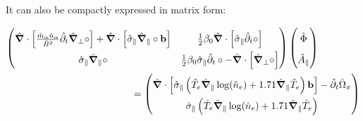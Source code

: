 It can also be compactly expressed in matrix form: 

\begin{align}
\renewcommand\arraystretch{1.8}
\begin{pmatrix}
\hat{\grad}\cdot\left[\frac{\hat{m}_\alpha \hat{n}_\alpha}{ \hat{B}^2}\hat{\partial}_t\hat{\grad}_\perp\circ\right] +  \hat{\grad}\cdot\left[\hat{\sigma}_\parallel\hat{\grad}_\parallel\circ\mathbf{b}\right] & 
\frac{1}{2}\beta_0\hat{\grad}\cdot\left[\hat{\sigma}_\parallel\hat{\partial}_t\circ\right]
\\
\hat{\sigma}_\parallel\hat{\grad}_\parallel\circ & 
\frac{1}{2}\beta_0\hat{\sigma}_\parallel\hat{\partial}_t\circ-\hat{\grad}\cdot\left[\hat{\grad}_\perp\circ\right]
\end{pmatrix}
\begin{pmatrix}
\hat{\Phi} \\ \hat{A}_\parallel
\end{pmatrix} 
\hspace{1.5cm}\nonumber \\ \label{eq:vorticityEquation_electromagnetic_dedimensionalized_matrix}\hspace{1.5cm}
= 
\begin{pmatrix}
\hat{\grad}\cdot\left[\hat{\sigma}_\parallel\left(
\hat{T}_e\hat{\grad}_\parallel\log(\hat{n}_e) + 1.71\hat{\grad}_\parallel \hat{T}_e
\right)\mathbf{b}\right]-\hat{\partial}_t \hat{\Omega}_\pi \\
\hat{\sigma}_\parallel\left(
\hat{T}_e\hat{\grad}_\parallel\log(\hat{n}_e) + 1.71\hat{\grad}_\parallel \hat{T}_e
\right)
\end{pmatrix}
\end{align}



